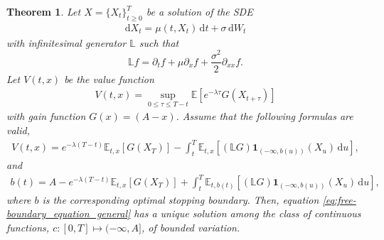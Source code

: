 \documentclass{tufte-handout}
\newcommand{\E}{\mathbb{E}} %
\newcommand{\InfGen}{\mathbb{L}} %
\newcommand{\dif}{\mathrm{d}}
\newtheorem{thm}{Theorem}
\begin{document}
	\begin{thm}
		Let $X = \{X_t\}_{t\geq 0}^T$ be a solution of the SDE
		\begin{align*}
		\dif X_t = \mu(t, X_t)\,\dif t + \sigma\,\dif W_t
		\end{align*}
		with infinitesimal generator $\InfGen$ such that
		$$
		\InfGen f = \partial_t f + \mu\partial_xf + \frac{\sigma^2}{2}\partial_{xx}f. 
		$$
		Let $V(t, x)$ be the value function
		\begin{align}\label{eq:OST_general}
		V(t, x) = \sup_{0\leq \tau \leq T - t}\E\left[e^{-\lambda \tau}G(X_{t + \tau})\right]
		\end{align}
		with gain function $G(x) = (A - x)$. Assume that the following formulas are valid,
		\begin{align}\label{eq:pricing_formula_general}
		V(t, x) = e^{-\lambda (T - t)}\E_{t, x}[G(X_T)] - \int_{t}^{T}\E_{t, x}[(\InfGen G)\mathbf{1}_{(-\infty, b(u))}(X_u)\,\dif u], 
		\end{align}
		and
		\begin{align}\label{eq:free-boundary_equation_general}
		b(t) = A - e^{-\lambda (T - t)}\E_{t, x}[G(X_T)] + \int_{t}^{T}\E_{t, b(t)}[(\InfGen G)\mathbf{1}_{(-\infty, b(u))}(X_u)\,\dif u],
		\end{align}
		where $b$ is the corresponding optimal stopping boundary. Then, equation \eqref{eq:free-boundary_equation_general} has a unique solution among the class of continuous functions, $c:[0, T]\mapsto (-\infty, A]$, of bounded variation.  	
	\end{thm}
	
\end{document}
